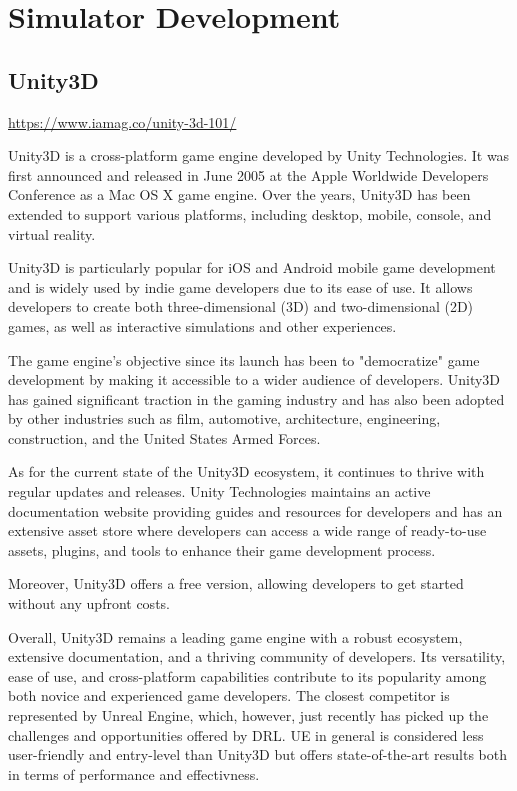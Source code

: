 \section{Simulator Development}


\subsection{Unity3D}

{\url{https://www.iamag.co/unity-3d-101/}}

\begin{textblock}


Unity3D is a cross-platform game engine developed by Unity Technologies. It was first announced and released in June 2005 at the Apple Worldwide Developers Conference as a Mac OS X game engine. Over the years, Unity3D has been extended to support various platforms, including desktop, mobile, console, and virtual reality.\cite{unitywiki}

Unity3D is particularly popular for iOS and Android mobile game development and is widely used by indie game developers due to its ease of use. It allows developers to create both three-dimensional (3D) and two-dimensional (2D) games, as well as interactive simulations and other experiences.\cite{unitywiki}

The game engine's objective since its launch has been to "democratize" game development by making it accessible to a wider audience of developers. Unity3D has gained significant traction in the gaming industry and has also been adopted by other industries such as film, automotive, architecture, engineering, construction, and the United States Armed Forces.\cite{unitywiki}\cite{unitycontract2022}

As for the current state of the Unity3D ecosystem, it continues to thrive with regular updates and releases. Unity Technologies maintains an active documentation website providing guides and resources for developers and has an extensive asset store where developers can access a wide range of ready-to-use assets, plugins, and tools to enhance their game development process.

Moreover, Unity3D offers a free version, allowing developers to get started without any upfront costs. 

Overall, Unity3D remains a leading game engine with a robust ecosystem, extensive documentation, and a thriving community of developers. Its versatility, ease of use, and cross-platform capabilities contribute to its popularity among both novice and experienced game developers.
The closest competitor is represented by Unreal Engine, which, however, just recently has picked up the challenges and opportunities offered by DRL. UE in general is considered less user-friendly and entry-level than Unity3D but offers state-of-the-art results both in terms of performance and effectivness. 

\end{textblock}


